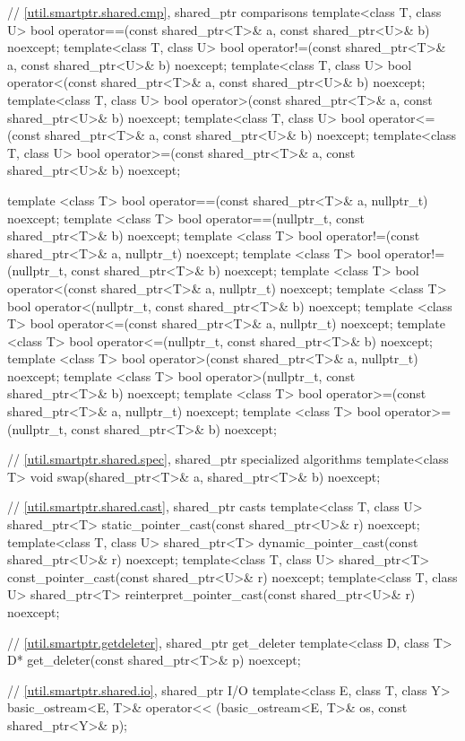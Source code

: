 \begin{codeblock}
{  // \ref{util.smartptr.shared.cmp}, shared_ptr comparisons
  template<class T, class U>
    bool operator==(const shared_ptr<T>& a, const shared_ptr<U>& b) noexcept;
  template<class T, class U>
    bool operator!=(const shared_ptr<T>& a, const shared_ptr<U>& b) noexcept;
  template<class T, class U>
    bool operator<(const shared_ptr<T>& a, const shared_ptr<U>& b) noexcept;
  template<class T, class U>
    bool operator>(const shared_ptr<T>& a, const shared_ptr<U>& b) noexcept;
  template<class T, class U>
    bool operator<=(const shared_ptr<T>& a, const shared_ptr<U>& b) noexcept;
  template<class T, class U>
    bool operator>=(const shared_ptr<T>& a, const shared_ptr<U>& b) noexcept;

  template <class T>
    bool operator==(const shared_ptr<T>& a, nullptr_t) noexcept;
  template <class T>
    bool operator==(nullptr_t, const shared_ptr<T>& b) noexcept;
  template <class T>
    bool operator!=(const shared_ptr<T>& a, nullptr_t) noexcept;
  template <class T>
    bool operator!=(nullptr_t, const shared_ptr<T>& b) noexcept;
  template <class T>
    bool operator<(const shared_ptr<T>& a, nullptr_t) noexcept;
  template <class T>
    bool operator<(nullptr_t, const shared_ptr<T>& b) noexcept;
  template <class T>
    bool operator<=(const shared_ptr<T>& a, nullptr_t) noexcept;
  template <class T>
    bool operator<=(nullptr_t, const shared_ptr<T>& b) noexcept;
  template <class T>
    bool operator>(const shared_ptr<T>& a, nullptr_t) noexcept;
  template <class T>
    bool operator>(nullptr_t, const shared_ptr<T>& b) noexcept;
  template <class T>
    bool operator>=(const shared_ptr<T>& a, nullptr_t) noexcept;
  template <class T>
    bool operator>=(nullptr_t, const shared_ptr<T>& b) noexcept;

  // \ref{util.smartptr.shared.spec}, shared_ptr specialized algorithms
  template<class T>
    void swap(shared_ptr<T>& a, shared_ptr<T>& b) noexcept;

  // \ref{util.smartptr.shared.cast}, shared_ptr casts
  template<class T, class U>
    shared_ptr<T> static_pointer_cast(const shared_ptr<U>& r) noexcept;
  template<class T, class U>
    shared_ptr<T> dynamic_pointer_cast(const shared_ptr<U>& r) noexcept;
  template<class T, class U>
    shared_ptr<T> const_pointer_cast(const shared_ptr<U>& r) noexcept;
  template<class T, class U>
    shared_ptr<T> reinterpret_pointer_cast(const shared_ptr<U>& r) noexcept;

  // \ref{util.smartptr.getdeleter}, shared_ptr get_deleter
  template<class D, class T>
    D* get_deleter(const shared_ptr<T>& p) noexcept;

  // \ref{util.smartptr.shared.io}, shared_ptr I/O
  template<class E, class T, class Y>
    basic_ostream<E, T>& operator<< (basic_ostream<E, T>& os, const shared_ptr<Y>& p);
}
\end{codeblock}


